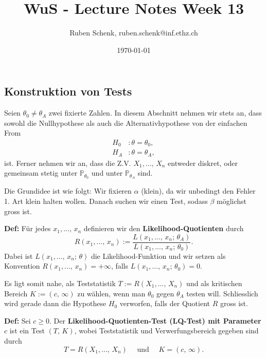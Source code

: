 \documentclass[a4paper]{extarticle}
\title{WuS - Lecture Notes Week 13}
\author{Ruben Schenk, ruben.schenk@inf.ethz.ch}
\date{\today}
\begin{document}
\maketitle

\subsection{Konstruktion von Tests}

Seien $\theta_0 \neq \theta_A$ zwei fixierte Zahlen. In diesem Abschnitt nehmen wir stets an, dass sowohl die Nullhypothese als auch die Alternativhypothese von der einfachen From
\begin{align*}
    H_0 &: \theta = \theta_0,\\
    H_A &: \theta = \theta_A,
\end{align*}
ist. Ferner nehmen wir an, dass die Z.V. $X_1,..., \, X_n$ entweder diskret, oder gemeinsam stetig unter $\mathbb{P}_{\theta_0}$ und unter $\mathbb{P}_{\theta_A}$ sind.

Die Grundidee ist wie folgt: Wir fixieren $\alpha$ (klein), da wir unbedingt den Fehler 1. Art klein halten wollen. Danach suchen wir einen Test, sodass $\beta$ möglichst gross ist.

\textbf{Def:} Für jedes $x_1,..., \, x_n$ definieren wir den \textbf{Likelihood-Quotienten} durch
\[
    R(x_1,..., \, x_n) := \frac{L(x_1,..., \, x_n; \, \theta_A)}{L(x_1,..., \, x_n; \, \theta_0)}.
\]
Dabei ist $L(x_1,..., \, x_n; \, \theta)$ die Likelihood-Funktion und wir setzen als Konvention $R(x_1,..., \, x_n) = + \infty$, falls $L(x_1,..., \, x_n; \, \theta_0) = 0$.

Es ligt somit nahe, als Teststatistik $T:=R(X_1,..., \, X_n)$ und als kritischen Bereich $K := (c, \, \infty)$ zu wählen, wenn man $\theta_0$ gegen $\theta_A$ testen will. Schliesslich wird gerade dann die Hypothese $H_0$ verworfen, falls der Quotient $R$ gross ist.

\textbf{Def:} Sei $c \geq 0$. Der \textbf{Likelihood-Quotienten-Test (LQ-Test) mit Parameter} $c$ ist ein Test $(T, \, K)$, wobei Teststatistik und Verwerfungsbereich gegeben sind durch
\[
    T = R(X_1,..., \, X_n) \quad \text{ und } \quad K = (c, \, \infty).
\]
\end{document}
